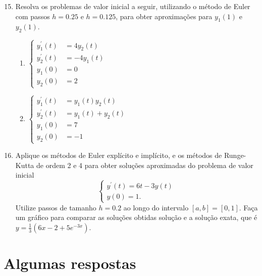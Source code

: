 \documentclass[12pt,a4paper]{article}
\begin{document}
\newpage
\begin{enumerate}
\setcounter{enumi}{14}
\item Resolva os problemas de valor inicial a seguir, utilizando o método de Euler com passos $h = 0.25$ e $h=0.125$, para obter aproximações para $y_1(1)$ e $y_2(1)$.
\begin{multicols}{2}
\begin{enumerate}
\item $\begin{cases}
y_1^\prime(t) &= 4y_2(t)\\
y_2^\prime(t) &= -4y_1(t)\\
y_1(0) &= 0\\
y_2(0) &= 2
\end{cases}$

\item $\begin{cases}
y_1^\prime(t) &= y_1(t) y_2(t)\\
y_2^\prime(t) &= y_1(t)+y_2(t)\\
y_1(0) &= 7\\
y_2(0) &= -1
\end{cases}$
\end{enumerate}
\end{multicols}

\item Aplique os métodos de Euler explícito e implícito, e os métodos de Runge-Kutta de ordem 2 e 4 para obter soluções aproximadas do problema de valor inicial
\[
\begin{cases}
y^\prime(t) = 6t - 3y(t) \\
y(0) = 1.
\end{cases}\]
Utilize passos de tamanho $h = 0.2$ ao longo do intervalo $[a,b] = [0, 1]$. Faça um gráfico para comparar as soluções obtidas solução e a solução exata, que é $y = \frac{1}{3} (6 x - 2 + 5 e^{-3 x})$.
\end{enumerate}

\newpage
\section*{Algumas respostas}
\end{document}
